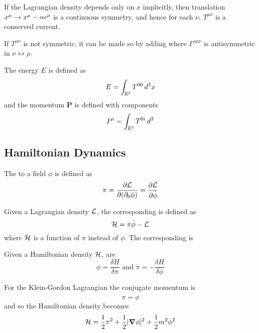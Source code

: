 \documentclass{article}
\begin{document}
\begin{theorem}
If the Lagrangian density depends only on $x$ implicitly, then translation $x^\mu \to x^\mu-\alpha\eps^\mu$ is a continuous symmetry, and hence for each $\nu$, $T^{\mu\nu}$ is a conserved current. 
\end{theorem}

\begin{idea}
If $T^{\mu\nu}$ is not symmetric, it can be made so by adding 
where $\Gamma^{\rho\mu\nu}$ is antisymmetric in $\nu\leftrightarrow \rho$. 
\end{idea}

\begin{definition}
The energy $E$ is defined as 
\[
E=\int_{\mbb{R}^3} T^{00} \, d^3x
\]
and the momentum $\bm{P}$ is defined with components 
\[
P^i = \int_{\mbb{R}^3} T^{0i} \, d^3
\]

\end{definition}

\subsection{Hamiltonian Dynamics}

\begin{definition}
The  to a field $\phi$ is defined as 
\[
\pi = \pd[\mc{L}]{(\del_0\phi)} = \pd[\mc{L}]{\dot{\phi}}
\]
\end{definition}

\begin{definition}
Given a Lagrangian density $\mc{L}$, the corresponding  is defined as 
\[
\mc{H}=\pi \dot{\phi}-\mc{L}
\]
where $\mc{H}$ is a function of $\pi$ instead of $\dot{\phi}$. The corresponding  is 
\end{definition}

\begin{definition}
Given a Hamiltonian density $\mc{H}$,  are 
\[
\dot{\phi}=\frac{\delta H}{\delta \pi} \text{ and } \dot{\pi}=-\frac{\delta H}{\delta \phi} 
\]
\end{definition}

\begin{example}
For the Klein-Gordon Lagrangian the conjugate momentum is 
\[
\pi=\dot{\phi}
\]
and so the Hamiltonian density becomes 
\[
\mc{H}=\frac{1}{2}\pi^2+\frac{1}{2}|\grad\phi|^2+\frac{1}{2}m^2\phi^2
\]
\end{example}
\end{document}
